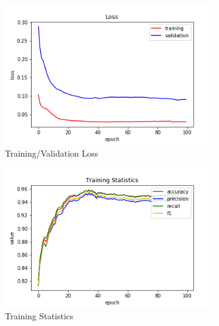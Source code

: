 \begin{figure}[h!]
  \centerfloat
  \begin{subfigure}[b]{0.35\linewidth}
    \includegraphics[width=\linewidth]{images/trained_online_lstm/tile_by_tile_training_uniform_random_fill_10000_block_map_10000_model_loss.png}
     \caption{Training/Validation Loss}
  \end{subfigure}
  \hfill
  \begin{subfigure}[b]{0.35\linewidth}
    \includegraphics[width=\linewidth]{images/trained_online_lstm/tile_by_tile_training_uniform_random_fill_10000_block_map_10000_model_training_stats.png}
     \caption{Training Statistics}
  \end{subfigure}
  \hfill
  \begin{subfigure}[b]{0.35\linewidth}

\end{subfigure}
\end{figure}

